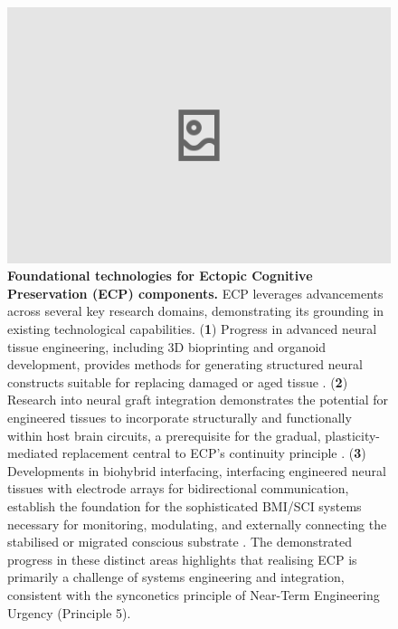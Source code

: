 \documentclass[10pt]{article}
\begin{document}
\begin{sloppypar}
  \begin{figure}[ht]
    \centering
    \includegraphics[width=\textwidth]{figures/ecp-near-term-technologies.png}
    \caption[ECP: Foundational technologies for Ectopic Cognitive Preservation components]{\textbf{Foundational technologies for Ectopic Cognitive Preservation (ECP) components.} ECP leverages advancements across several key research domains, demonstrating its grounding in existing technological capabilities. (\textbf{1}) Progress in advanced neural tissue engineering, including 3D bioprinting and organoid development, provides methods for generating structured neural constructs suitable for replacing damaged or aged tissue \citep{jin_integration_2023}. (\textbf{2}) Research into neural graft integration demonstrates the potential for engineered tissues to incorporate structurally and functionally within host brain circuits, a prerequisite for the gradual, plasticity-mediated replacement central to ECP’s continuity principle \citep{hebert_lab_research_2025,hebert_could_2022,jin_integration_2023}. (\textbf{3}) Developments in biohybrid interfacing, interfacing engineered neural tissues with electrode arrays for bidirectional communication, establish the foundation for the sophisticated BMI/SCI systems necessary for monitoring, modulating, and externally connecting the stabilised or migrated conscious substrate \citep{jordan_open_2024,vrselja_restoration_2019}. The demonstrated progress in these distinct areas highlights that realising ECP is primarily a challenge of systems engineering and integration, consistent with the synconetics principle of Near-Term Engineering Urgency (Principle 5).}
    \label{fig:ecp-near-term-technologies}
  \end{figure}


\end{sloppypar}
\end{document}
